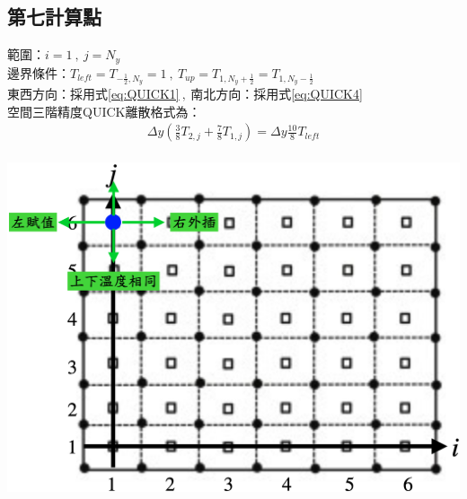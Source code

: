 \documentclass[12pt]{article}
\begin{document}
\newpage
\subsection{第七計算點}
 \begin{minipage}{0.6\textwidth}
   \noindent 範圍：$i=1\ ,\ j=N_{y}$\\[1.5ex]
   \noindent 邊界條件：$T_{left} = T_{-\frac{1}{2},N_{y}}= 1\ ,\ T_{up} = T_{1,N_{y}+\frac{1}{2}}=T_{1,N_{y}-\frac{1}{2}}$\\[1.5ex]
   \noindent 東西方向：採用式\eqref{eq:QUICK1}$\ ,\ $南北方向：採用式\eqref{eq:QUICK4}\\[1.5ex]
   \noindent 空間三階精度QUICK離散格式為：
   \begin{equation*}\begin{split}
   \Delta y(\frac{3}{8}T_{2,j} + \frac{7}{8}T_{1,j}) = \Delta y\frac{10}{8}T_{left} \\
   \end{split}\end{equation*}
   \end{minipage}%
   \hfill
   \begin{minipage}{0.34\textwidth}
   \centering
   \includegraphics[width=\linewidth,height=9\baselineskip]{26.png}
   \label{fig:7th point}
\end{minipage}
\end{document}
